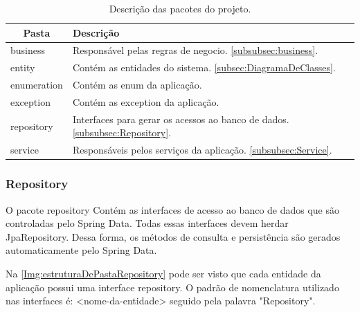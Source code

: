 \begin{table}[!ht]
\centering
\begin{tabular}{|l|l|}
\hline
\multicolumn{1}{|c|}{{\color[HTML]{000000} \textbf{Pasta}}} & {\color[HTML]{000000} \textbf{Descrição}} \\ \hline
business                                                    & \multicolumn{1}{p{10.00cm}|}{Responsável pelas regras de negocio. \autoref{subsubsec:business}. }\\ \hline
entity                                                      & \multicolumn{1}{p{10.00cm}|}{Contém as entidades do sistema. \autoref{subsec:DiagramaDeClasses}. }\\ \hline
enumeration                                                 & \multicolumn{1}{p{10.00cm}|}{Contém as enum da aplicação.}\\ \hline
exception                                                   & \multicolumn{1}{p{10.00cm}|}{Contém as exception da aplicação.}\\ \hline
repository                                                  & \multicolumn{1}{p{10.00cm}|}{Interfaces para gerar os acessos ao banco de dados. \autoref{subsubsec:Repository}.}\\ \hline
service                                                     & \multicolumn{1}{p{10.00cm}|}{Responsáveis pelos serviços da aplicação. \autoref{subsubsec:Service}.}\\ \hline
\end{tabular}
\caption{Descrição das pacotes do projeto.}
\label{Tab:DescricaoDasPastasProjeto}
\end{table}


\subsubsection{Repository}\label{subsubsec:Repository}



O pacote repository Contém as interfaces de acesso ao banco de dados que são controladas pelo Spring Data. Todas essas interfaces devem herdar JpaRepository. Dessa forma, os métodos de consulta e persistência são gerados automaticamente pelo Spring Data.

Na \autoref{Img:estruturaDePastaRepository} pode ser visto que cada entidade da aplicação possui uma interface repository. O padrão de nomenclatura utilizado nas interfaces é: <nome-da-entidade> seguido pela palavra "Repository".

